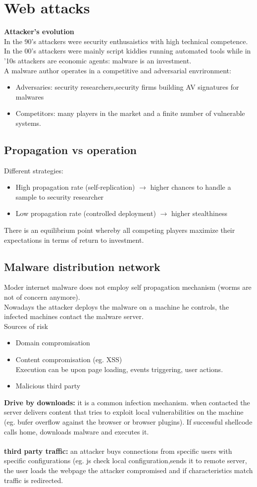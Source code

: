 \documentclass[10pt,a4paper]{book}
\begin{document}
\chapter{Web attacks}
\textbf{Attacker's evolution}\\
In the 90's attackers were security enthusaistics with high technical competence. In the 00's attackers were mainly script kiddies running automated tools while in '10s attackers are economic agents: malware is an investment.\\
A malware author operates in a competitive and adversarial envrironment:
\begin{itemize}
\item Adversaries: security researchers,security firms building AV signatures for malwares
\item Competitors: many players in the market and a finite number of vulnerable systems.
\end{itemize}
\section{Propagation vs operation}
Different strategies:
\begin{itemize}
\item High propagation rate (self-replication) $\to$  higher chances to handle a sample to security researcher
\item Low propagation rate (controlled deployment) $\to$ higher stealthiness
\end{itemize}
There is an equilibrium point whereby all competing players maximize their expectations in terms of return to investment.\\
\section{Malware distribution network}
Moder internet malware does not employ self propagation mechanism (worms are not of concern anymore).\\
Nowadays the attacker deploys the malware on a machine he controls, the infected machines contact the malware server.\\
Sources of risk
\begin{itemize}
\item Domain compromisation
\item Content compromisation (eg. XSS)\\
Execution can be upon page loading, events triggering, user actions.
\item Malicious third party
\end{itemize}
\textbf{Drive by downloads:} it is a common infection mechanism. when contacted the server delivers content that tries to exploit local vulnerabilities on the machine (eg. bufer overflow against the browser or browser plugins). If successful shellcode calls home, downloads malware and executes it.\\\\
\textbf{third party traffic:} an attacker buys connections from specific users with specific configurations (eg. js check local configuration,sends it to remote server, the user loads the webpage the attacker compromised and if characteristics match traffic is redirected.
\end{document}
